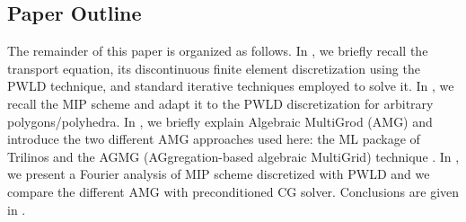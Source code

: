 \subsection{Paper Outline}

The remainder of this paper is organized as follows. In ,
we briefly recall the \sn transport equation, its discontinuous finite element
discretization using the PWLD technique, and standard iterative techniques
employed to solve it. In , we recall the MIP scheme and  adapt it
to the PWLD discretization for arbitrary polygons/polyhedra. In ,
we briefly explain Algebraic MultiGrod (AMG) and introduce the two different
AMG approaches used here: the ML package of Trilinos \cite{ml_guide} and the
AGMG (AGgregation-based algebraic MultiGrid) technique \cite{agmg_guide}. In
, we present a Fourier analysis of MIP scheme discretized with
PWLD and we compare the different AMG with preconditioned CG solver.
Conclusions are given in .
